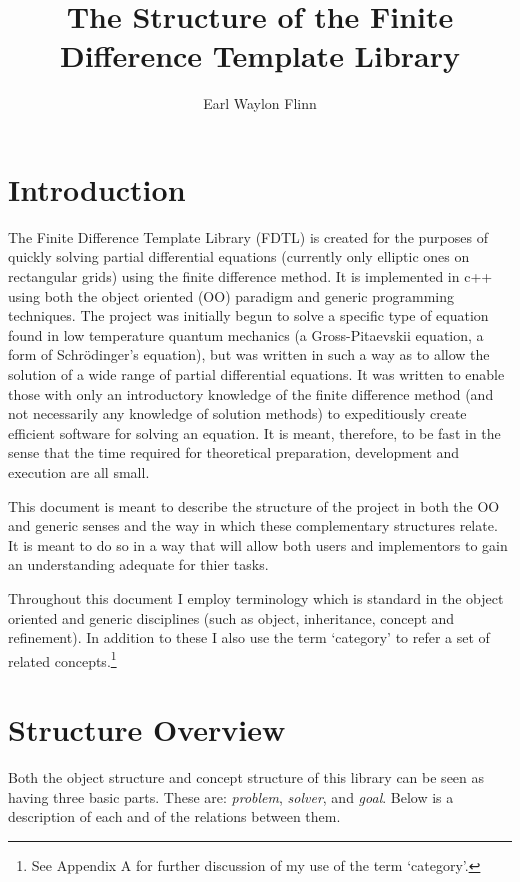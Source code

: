 \documentclass{article}
\title{The Structure of the Finite Difference Template Library}
\author{Earl Waylon Flinn}
\begin{document}
\maketitle
\section{Introduction}


The Finite Difference Template Library (FDTL) is created for the purposes of
quickly solving partial differential equations (currently only elliptic ones
on rectangular grids) using the finite difference method. It is implemented 
in c++ using both the object oriented (OO) paradigm and generic programming 
techniques. The project was initially begun to solve a specific type of 
equation found in low temperature quantum mechanics (a Gross-Pitaevskii 
equation, a form of Schr\"odinger's equation), but was written in such a way
as to allow the solution of a wide range of partial differential equations. 
It was written to enable those with only an introductory knowledge of the 
finite difference method (and not necessarily any knowledge of solution 
methods) to  expeditiously create efficient software for solving an equation.
It is meant, therefore, to be fast in the sense that the time required for 
theoretical preparation, development and execution are all small.


This document is meant to describe the structure of the project in both the OO 
and generic senses and the way in which these complementary structures relate. 
It is meant to do so in a way that will allow both users and implementors to 
gain an understanding adequate for thier tasks.


Throughout this document I employ terminology which is standard in the object 
oriented and generic disciplines (such as object, inheritance, concept and 
refinement). In addition to these I also use the term `category' to refer a 
set of related concepts.\footnote{ See Appendix A for further discussion of my
use of the term `category'.}

\section{Structure Overview}

Both the object structure and concept structure of this library can be seen as
having three basic parts. These are: \emph{problem}, \emph{solver}, and 
\emph{goal}. Below is a description of each and of the relations between them.
\end{document}
